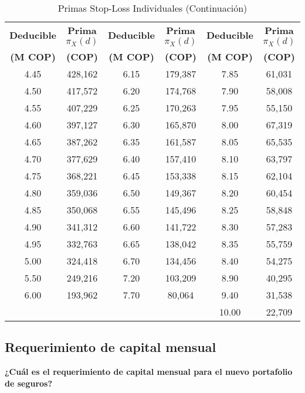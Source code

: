\begin{table}[H]
\centering
\caption{Primas Stop-Loss Individuales (Continuación)}
\scriptsize
\begin{tabular}{|c|c|c|c|c|c|}
\hline
\textbf{Deducible} & \textbf{Prima $\pi_X(d)$} & \textbf{Deducible} & \textbf{Prima $\pi_X(d)$} & \textbf{Deducible} & \textbf{Prima $\pi_X(d)$} \\
\textbf{(M COP)} & \textbf{(COP)} & \textbf{(M COP)} & \textbf{(COP)} & \textbf{(M COP)} & \textbf{(COP)} \\
\hline
4.45 & 428,162 & 6.15 & 179,387 & 7.85 & 61,031 \\
4.50 & 417,572 & 6.20 & 174,768 & 7.90 & 58,008 \\
4.55 & 407,229 & 6.25 & 170,263 & 7.95 & 55,150 \\
4.60 & 397,127 & 6.30 & 165,870 & 8.00 & 67,319 \\
4.65 & 387,262 & 6.35 & 161,587 & 8.05 & 65,535 \\
4.70 & 377,629 & 6.40 & 157,410 & 8.10 & 63,797 \\
4.75 & 368,221 & 6.45 & 153,338 & 8.15 & 62,104 \\
4.80 & 359,036 & 6.50 & 149,367 & 8.20 & 60,454 \\
4.85 & 350,068 & 6.55 & 145,496 & 8.25 & 58,848 \\
4.90 & 341,312 & 6.60 & 141,722 & 8.30 & 57,283 \\
4.95 & 332,763 & 6.65 & 138,042 & 8.35 & 55,759 \\
5.00 & 324,418 & 6.70 & 134,456 & 8.40 & 54,275 \\
5.50 & 249,216 & 7.20 & 103,209 & 8.90 & 40,295 \\
6.00 & 193,962 & 7.70 & 80,064 & 9.40 & 31,538 \\
\multicolumn{2}{|c|}{} & \multicolumn{2}{c|}{} & 10.00 & 22,709 \\
\hline
\end{tabular}
\end{table}

\subsection{Requerimiento de capital mensual}

\textbf{¿Cuál es el requerimiento de capital mensual para el nuevo portafolio de seguros?}

